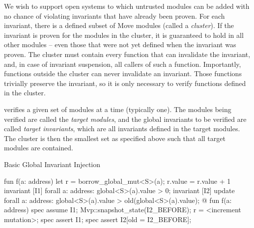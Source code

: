 
We wish to support open systems to which untrusted modules can be added
with no chance of violating invariants that have already been proven. For each
invariant, there is a defined subset of Move modules (called a
\textit{cluster}). If the invariant is proven for the modules in the cluster, it
is guaranteed to hold in all other modules -- even those that were not yet
defined when the invariant was proven.  The cluster must contain every function
that can invalidate the invariant, and, in case of invariant suspension, all
callers of such a function.  Importantly, functions outside the cluster can
never invalidate an invariant. Those functions trivially preserve the
invariant, so it is only necessary to verify functions defined in the cluster.

\MVP verifies a given set of modules at a time (typically one).  The modules
being verified are called the \textit{target modules}, and the global invariants
to be verified are called \textit{target invariants}, which are all invariants
defined in the target modules. The cluster is then the smallest set as specified
above such that all target modules are contained.


\begin{Figure}
  \caption{Basic Global Invariant Injection}
  \label{fig:GlobalInvariants}
  \centering
\begin{MoveBox}
  fun f(a: address) {
    let r = borrow_global_mut<S>(a);
    r.value = r.value + 1
  }
  invariant [I1] forall a: address: global<S>(a).value > 0;
  invariant [I2] update forall a: address:
      global<S>(a).value > old(global<S>(a).value);
  @\transform@
  fun f(a: address) {
    spec assume I1;
    Mvp::snapshot_state(I2_BEFORE);
    r = <increment mutation>;
    spec assert I1;
    spec assert I2[old = I2_BEFORE];
  }
\end{MoveBox}
\end{Figure}


